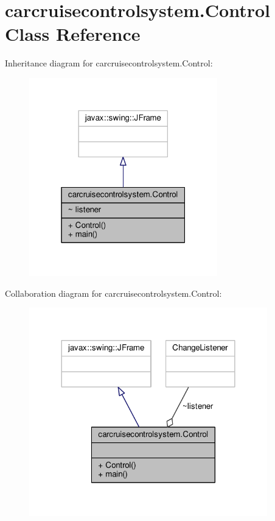 \hypertarget{classcarcruisecontrolsystem_1_1Control}{\section{carcruisecontrolsystem.\-Control Class Reference}
\label{classcarcruisecontrolsystem_1_1Control}
}


Inheritance diagram for carcruisecontrolsystem.\-Control\-:
\nopagebreak
\begin{figure}[H]
\begin{center}
\leavevmode
\includegraphics[width=232pt]{classcarcruisecontrolsystem_1_1Control__inherit__graph}
\end{center}
\end{figure}


Collaboration diagram for carcruisecontrolsystem.\-Control\-:
\nopagebreak
\begin{figure}[H]
\begin{center}
\leavevmode
\includegraphics[width=293pt]{classcarcruisecontrolsystem_1_1Control__coll__graph}
\end{center}
\end{figure}
